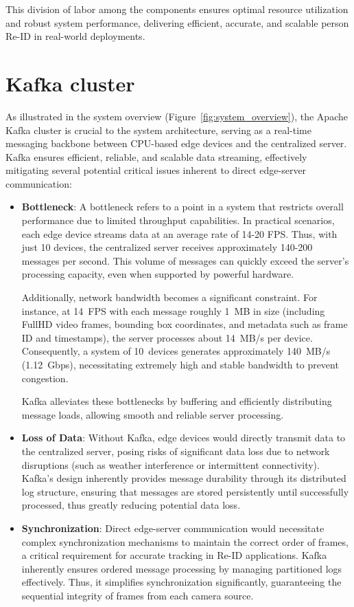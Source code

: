\documentclass[../main.tex]{subfiles}
\begin{document}
This division of labor among the components ensures optimal resource utilization and robust system performance, delivering efficient, accurate, and scalable person Re-ID in real-world deployments.


\section{Kafka cluster}
\label{sec:kafka_cluster}

As illustrated in the system overview (Figure~\ref{fig:system_overview}), the Apache Kafka cluster is crucial to the system architecture, serving as a real-time messaging backbone between CPU-based edge devices and the centralized server. Kafka ensures efficient, reliable, and scalable data streaming, effectively mitigating several potential critical issues inherent to direct edge-server communication:

\begin{itemize}
\item \textbf{Bottleneck}: A bottleneck refers to a point in a system that restricts overall performance due to limited throughput capabilities. In practical scenarios, each edge device streams data at an average rate of 14-20 FPS. Thus, with just 10 devices, the centralized server receives approximately 140-200 messages per second. This volume of messages can quickly exceed the server's processing capacity, even when supported by powerful hardware.

Additionally, network bandwidth becomes a significant constraint. For instance, at 14~FPS with each message roughly 1~MB in size (including FullHD video frames, bounding box coordinates, and metadata such as frame ID and timestamps), the server processes about 14~MB/s per device. Consequently, a system of 10~devices generates approximately 140~MB/s (1.12~Gbps), necessitating extremely high and stable bandwidth to prevent congestion.

Kafka alleviates these bottlenecks by buffering and efficiently distributing message loads, allowing smooth and reliable server processing.

\item \textbf{Loss of Data}: Without Kafka, edge devices would directly transmit data to the centralized server, posing risks of significant data loss due to network disruptions (such as weather interference or intermittent connectivity). Kafka's design inherently provides message durability through its distributed log structure, ensuring that messages are stored persistently until successfully processed, thus greatly reducing potential data loss.

\item \textbf{Synchronization}: Direct edge-server communication would necessitate complex synchronization mechanisms to maintain the correct order of frames, a critical requirement for accurate tracking in Re-ID applications. Kafka inherently ensures ordered message processing by managing partitioned logs effectively. Thus, it simplifies synchronization significantly, guaranteeing the sequential integrity of frames from each camera source.

\end{itemize}
\end{document}
